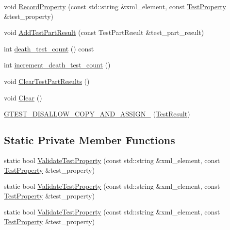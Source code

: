 \begin{DoxyCompactItemize}
\item 
void \mbox{\hyperlink{classtesting_1_1_test_result_ac253b0fd7ea70f457e9517e415eac32d}{Record\+Property}} (const std\+::string \&xml\+\_\+element, const \mbox{\hyperlink{classtesting_1_1_test_property}{Test\+Property}} \&test\+\_\+property)
\item 
void \mbox{\hyperlink{classtesting_1_1_test_result_ac28e9821ad3e9314c4fe41b119c5b44d}{Add\+Test\+Part\+Result}} (const Test\+Part\+Result \&test\+\_\+part\+\_\+result)
\item 
int \mbox{\hyperlink{classtesting_1_1_test_result_a827cb78135ac375d81d89ffedc3eca52}{death\+\_\+test\+\_\+count}} () const
\item 
int \mbox{\hyperlink{classtesting_1_1_test_result_a07faaa1d16a991f34222d02e10c75dc2}{increment\+\_\+death\+\_\+test\+\_\+count}} ()
\item 
void \mbox{\hyperlink{classtesting_1_1_test_result_aa11ed718e0a76a39e6380e5ddce7cae2}{Clear\+Test\+Part\+Results}} ()
\item 
void \mbox{\hyperlink{classtesting_1_1_test_result_a5371bc2e69435b4cb1fdad9ca81759a6}{Clear}} ()
\item 
\mbox{\hyperlink{classtesting_1_1_test_result_ad04e1d5d9eb623ba1d9fc82cdff43af4}{G\+T\+E\+S\+T\+\_\+\+D\+I\+S\+A\+L\+L\+O\+W\+\_\+\+C\+O\+P\+Y\+\_\+\+A\+N\+D\+\_\+\+A\+S\+S\+I\+G\+N\+\_\+}} (\mbox{\hyperlink{classtesting_1_1_test_result}{Test\+Result}})
\end{DoxyCompactItemize}
\subsection*{Static Private Member Functions}
\begin{DoxyCompactItemize}
\item 
static bool \mbox{\hyperlink{classtesting_1_1_test_result_a818c06cd2bfc00d6c81b0cebca044cb1}{Validate\+Test\+Property}} (const std\+::string \&xml\+\_\+element, const \mbox{\hyperlink{classtesting_1_1_test_property}{Test\+Property}} \&test\+\_\+property)
\item 
static bool \mbox{\hyperlink{classtesting_1_1_test_result_a01f4ffb668d3b2ffa9b1a11e7045001e}{Validate\+Test\+Property}} (const std\+::string \&xml\+\_\+element, const \mbox{\hyperlink{classtesting_1_1_test_property}{Test\+Property}} \&test\+\_\+property)
\item 
static bool \mbox{\hyperlink{classtesting_1_1_test_result_a01f4ffb668d3b2ffa9b1a11e7045001e}{Validate\+Test\+Property}} (const std\+::string \&xml\+\_\+element, const \mbox{\hyperlink{classtesting_1_1_test_property}{Test\+Property}} \&test\+\_\+property)
\end{DoxyCompactItemize}
